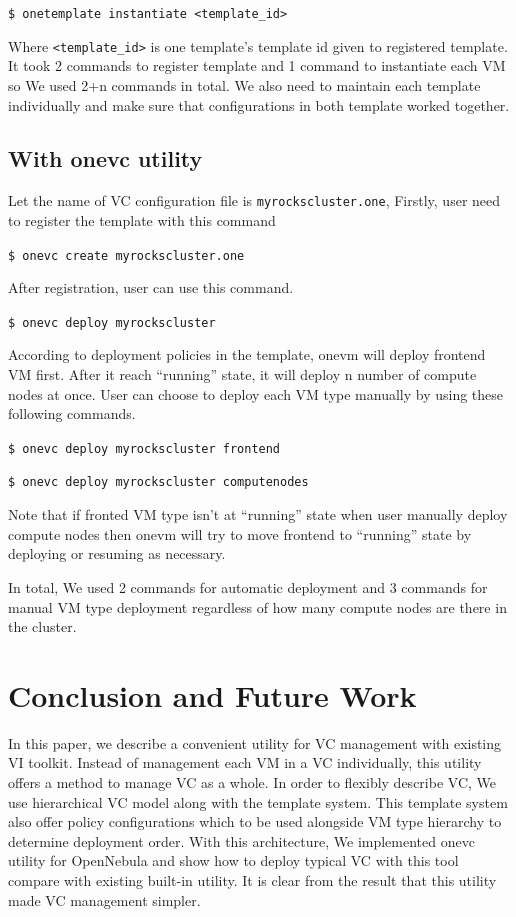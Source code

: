 \documentclass[conference]{IEEEtran}
\begin{document}
\texttt{\$ onetemplate instantiate <template\_id>}

Where \texttt{<template\_id>} is one template's template id given to registered template.
It took 2 commands to register template and 1 command to instantiate each VM so We used 2+n commands in total.
We also need to maintain each template individually and make sure that configurations in both template worked together.

\subsection{With onevc utility}

Let the name of VC configuration file is \texttt{myrockscluster.one}, Firstly, user need to register the template with this command

\texttt{\$ onevc create myrockscluster.one}

After registration, user can use this command.

\texttt{\$ onevc deploy myrockscluster}

According to deployment policies in the template, onevm will deploy frontend VM first.
After it reach ``running'' state, it will deploy n number of compute nodes at once.
User can choose to deploy each VM type manually by using these following commands. 

\texttt{\$ onevc deploy myrockscluster frontend}

\texttt{\$ onevc deploy myrockscluster computenodes}

Note that if fronted VM type isn't at ``running'' state when user manually deploy compute nodes then onevm will try to move frontend to ``running'' state by deploying or resuming as necessary.

In total, We used 2 commands for automatic deployment and 3 commands for manual VM type deployment regardless of how many compute nodes are there in the cluster.

\section{Conclusion and Future Work}
In this paper, we describe a convenient utility for VC management with existing VI toolkit.
Instead of management each VM in a VC individually, this utility offers a method to manage VC as a whole.
In order to flexibly describe VC, We use hierarchical VC model along with the template system.
This template system also offer policy configurations which to be used alongside VM type hierarchy to determine deployment order.
With this architecture, We implemented onevc utility for OpenNebula and show how to deploy typical VC with this tool compare with existing built-in utility.
It is clear from the result that this utility made VC management simpler.
\end{document}
